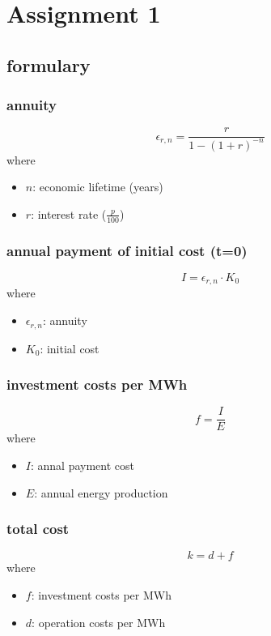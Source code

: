\documentclass{article}
\begin{document}
\section{Assignment 1}
\subsection{formulary}
\subsubsection{annuity}
\begin{equation}
\epsilon_{r,n}=\frac{r}{1-(1+r)^{-n}}
\end{equation}
where
\begin{itemize}
\item $n$: economic lifetime (years)
\item $r$: interest rate ($\frac{p}{100}$)
\end{itemize}
\subsubsection{annual payment of initial cost (t=0)}
\begin{equation}
I=\epsilon_{r,n}\cdot K_0
\end{equation}
where
\begin{itemize}
\item $\epsilon_{r,n}$: annuity
\item $K_0$: initial cost
\end{itemize}
\subsubsection{investment costs per MWh}
\begin{equation}
f=\frac{I}{E}
\end{equation}
where
\begin{itemize}
\item $I$: annal payment cost
\item $E$: annual energy production
\end{itemize}
\subsubsection{total cost}
\begin{equation}
k=d+f
\end{equation}
where
\begin{itemize}
\item $f$: investment costs per MWh
\item $d$: operation costs per MWh
\end{itemize}
\end{document}
